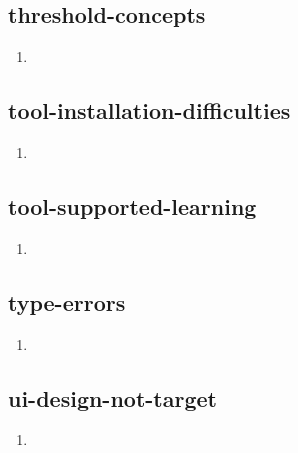 \documentclass{article}
\begin{document}
\subsection{threshold-concepts}
\begin{enumerate}
\item {}
\end{enumerate}

\subsection{tool-installation-difficulties}
\begin{enumerate}
\item {}
\end{enumerate}

\subsection{tool-supported-learning}
\begin{enumerate}
\item {}
\end{enumerate}

\subsection{type-errors}
\begin{enumerate}
\item {}
\end{enumerate}

\subsection{ui-design-not-target}
\begin{enumerate}
\item {}
\end{enumerate}
\end{document}
